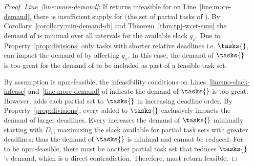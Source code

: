 \begin{theorem}
\begin{proof}
    \emph{Line~\ref{line:more-demand}}: If \tpj{} returns infeasible
    for \ants{} on Line~\ref{line:more-demand}, there is insufficient
    supply for  (the set of partial tasks of ). By
    Corollary~\ref{corollary:min-demand-di} and
    Theorem~\ref{thm:tpj-wcet-sum} the demand of  is
    minimal over all intervals for the available slack ${q_x}$. Due to
    Property~\ref{prop:divisions} only tasks with shorter relative
    deadlines i.e. ${\dot{\tasks{}}}$, can impact the demand of
     by affecting ${q_x}$. In this case, the demand of
    ${\dot{\tasks{}}}$ is too great for the demand of  to
    be included as part of a feasible task set.

    By assumption \ants{} is npm-feasible, the infeasibility
    conditions on Lines~\ref{line:no-slack-infease}
    and~\ref{line:more-demand} of \tpj{} indicate the demand of 
    ${\dot{\tasks{}}}$ is too great. However, \tpj{} adds each
    partial set  to ${\dot{\tasks{}}}$ in increasing
    deadline order. By Property~\ref{prop:divisions}, every 
     added to ${\dot{\tasks{}}}$ exclusively impacts the
    demand of larger deadlines. Every  increases the demand of
    ${\dot{\tasks{}}}$ minimally starting with ${D_1}$, maximizing the
    slack available for partial task sets with greater deadlines; thus
    the demand of ${\dot{\tasks{}}}$ is minimal and cannot be
    reduced. For \ants{} to be npm-feasible, there must be another
    partial task set that reduces ${\dot{\tasks{}}}$'s demand,
    which is a direct contradiction. Therefore, \tpj{} must return
    feasible.
  \end{proof}
\end{theorem}
